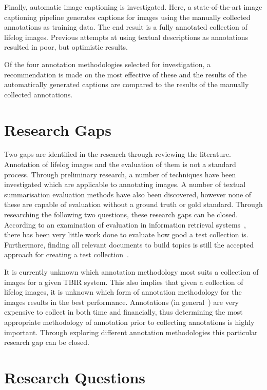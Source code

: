 Finally, automatic image captioning is investigated. Here, a state-of-the-art image captioning pipeline generates captions for images using the manually collected annotations as training data. The end result is a fully annotated collection of lifelog images. Previous attempts at using textual descriptions as annotations~\cite{scells2016qut} resulted in poor, but optimistic results. 

Of the four annotation methodologies selected for investigation, a recommendation is made on the most effective of these and the results of the automatically generated captions are compared to the results of the manually collected annotations. 

\section{Research Gaps}

Two gaps are identified in the research through reviewing the literature. Annotation of lifelog images and the evaluation of them is not a standard process. Through preliminary research, a number of techniques have been investigated which are applicable to annotating images. A number of textual summarisation evaluation methods have also been discovered, however none of these are capable of evaluation without a ground truth or gold standard. Through researching the following two questions, these research gaps can be closed. According to an examination of evaluation in information retrieval systems~\cite[p. 24]{sanderson2010test}, there has been very little work done to evaluate how good a test collection is. Furthermore, finding all relevant documents to build topics is still the accepted approach for creating a test collection~\cite{cooper1973selecting}.

It is currently unknown which annotation methodology most suits a collection of images for a given TBIR system. This also implies that given a collection of lifelog images, it is unknown which form of annotation methodology for the images results in the best performance. Annotations (in general~\cite{snow2008cheap}) are very expensive to collect in both time and financially, thus determining the most appropriate methodology of annotation prior to collecting annotations is highly important. Through exploring different annotation methodologies this particular research gap can be closed.

\section{Research Questions}


